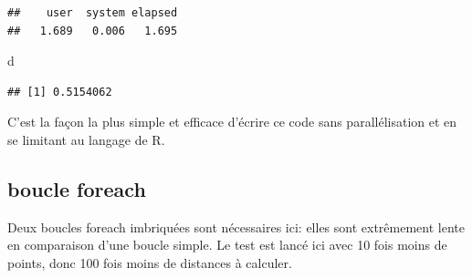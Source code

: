 \documentclass[
  12pt,
  french,
  a4paper,
  extrafontsizes,onecolumn,openright
  ]{memoir}
\newenvironment{Shaded}{\begin{snugshade}}{\end{snugshade}}
\newcommand{\ControlFlowTok}[1]{\textcolor[rgb]{0.13,0.29,0.53}{\textbf{#1}}}
\newcommand{\DataTypeTok}[1]{\textcolor[rgb]{0.13,0.29,0.53}{#1}}
\newcommand{\DecValTok}[1]{\textcolor[rgb]{0.00,0.00,0.81}{#1}}
\newcommand{\KeywordTok}[1]{\textcolor[rgb]{0.13,0.29,0.53}{\textbf{#1}}}
\newcommand{\NormalTok}[1]{#1}
\newcommand{\OperatorTok}[1]{\textcolor[rgb]{0.81,0.36,0.00}{\textbf{#1}}}
\newcommand{\StringTok}[1]{\textcolor[rgb]{0.31,0.60,0.02}{#1}}
\begin{document}
\begin{verbatim}
##    user  system elapsed 
##   1.689   0.006   1.695
\end{verbatim}

\begin{Shaded}
\begin{Highlighting}[]
\NormalTok{d}
\end{Highlighting}
\end{Shaded}

\begin{verbatim}
## [1] 0.5154062
\end{verbatim}

\normalsize
C'est la façon la plus simple et efficace d'écrire ce code sans parallélisation et en se limitant au langage de R.

\hypertarget{boucle-foreach}{%
\subsection{boucle foreach}\label{boucle-foreach}}

Deux boucles foreach imbriquées sont nécessaires ici: elles sont extrêmement lente en comparaison d'une boucle simple.
Le test est lancé ici avec 10 fois moins de points, donc 100 fois moins de distances à calculer.

\scriptsize

\begin{Shaded}
\end{Shaded}
\end{document}
